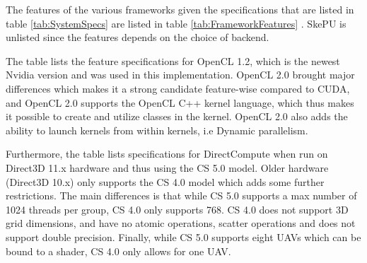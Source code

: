The features of the various frameworks given the specifications that are listed in table \ref{tab:SystemSpecs} are listed in table \ref{tab:FrameworkFeatures} \cite{CudaDOCS}\cite{DCGuide}\cite{DCGuideNvidia}. SkePU is unlisted since the features depends on the choice of backend. 

The table lists the feature specifications for OpenCL 1.2, which is the newest Nvidia version and was used in this implementation.
OpenCL 2.0 brought major differences which makes it a strong candidate feature-wise compared to CUDA, and OpenCL 2.0 supports the OpenCL C++ kernel language, which thus makes it possible to create and utilize classes in the kernel. OpenCL 2.0 also adds the ability to launch kernels from within kernels, i.e Dynamic parallelism.

Furthermore, the table lists specifications for DirectCompute when run on Direct3D 11.x hardware and thus using the CS 5.0 model. Older hardware (Direct3D 10.x) only supports the CS 4.0 model which adds some further restrictions. 
The main differences is that while CS 5.0 supports a max number of 1024 threads per group, CS 4.0 only supports 768. CS 4.0 does not support 3D grid dimensions, and have no atomic operations, scatter operations and does not support double precision. Finally, while CS 5.0 supports eight UAVs which can be bound to a shader, CS 4.0 only allows for one UAV.

